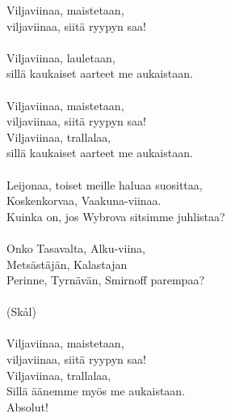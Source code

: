 
            Viljaviinaa, maistetaan, \\
            viljaviinaa, siitä ryypyn saa! \\
\hspace{10mm} \\
            Viljaviinaa, lauletaan, \\
            sillä kaukaiset aarteet me aukaistaan. \\
\hspace{10mm} \\
            Viljaviinaa, maistetaan, \\
            viljaviinaa, siitä ryypyn saa! \\
            Viljaviinaa, trallalaa, \\
            sillä kaukaiset aarteet me aukaistaan. \\
\hspace{10mm} \\
            Leijonaa, toiset meille haluaa suosittaa, \\
            Koskenkorvaa, Vaakuna-viinaa. \\
            Kuinka on, jos Wybrova sitsimme juhlistaa? \\
\hspace{10mm} \\
            Onko Tasavalta, Alku-viina, \\
            Metsästäjän, Kalastajan \\
            Perinne, Tyrnävän, Smirnoff parempaa? \\
\hspace{10mm} \\
            (Skål) \\
\hspace{10mm} \\
            Viljaviinaa, maistetaan, \\
            viljaviinaa, siitä ryypyn saa! \\
            Viljaviinaa, trallalaa, \\
            Sillä äänemme myös me aukaistaan. \\
            Absolut! \\
             \\
\hspace{10mm} \\
 \\
\hspace{10mm} \\
